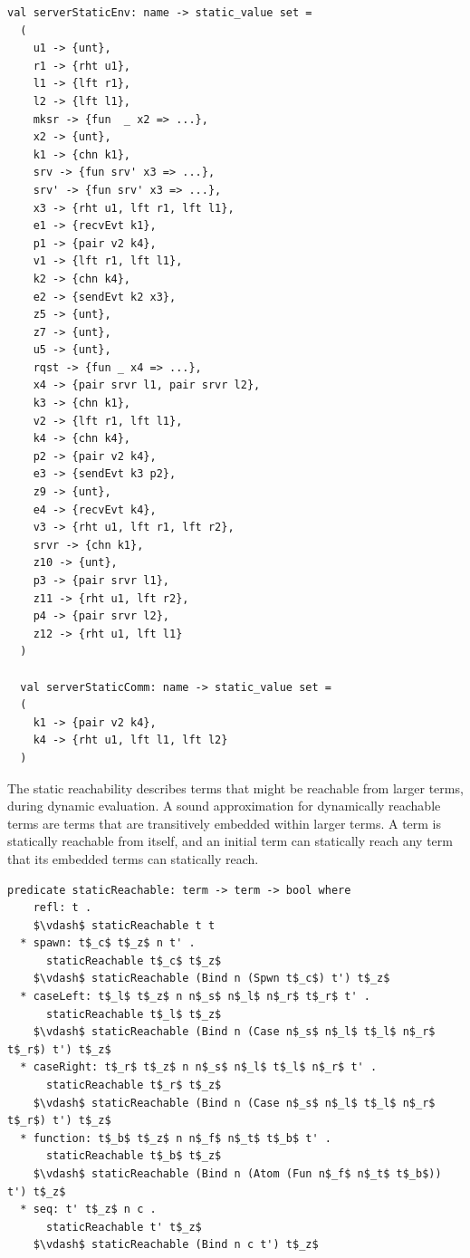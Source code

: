 \documentclass[letterpaper, 11pt]{extarticle}
\begin{document}
\begin{lstlisting}[language=sugar_lang, mathescape]
  val serverStaticEnv: name -> static_value set =
  (
    u1 -> {unt},
    r1 -> {rht u1},
    l1 -> {lft r1},
    l2 -> {lft l1},
    mksr -> {fun  _ x2 => ...},
    x2 -> {unt},
    k1 -> {chn k1},
    srv -> {fun srv' x3 => ...},
    srv' -> {fun srv' x3 => ...},
    x3 -> {rht u1, lft r1, lft l1},
    e1 -> {recvEvt k1},
    p1 -> {pair v2 k4},
    v1 -> {lft r1, lft l1},
    k2 -> {chn k4},
    e2 -> {sendEvt k2 x3},
    z5 -> {unt},
    z7 -> {unt},
    u5 -> {unt},
    rqst -> {fun _ x4 => ...},
    x4 -> {pair srvr l1, pair srvr l2},
    k3 -> {chn k1},
    v2 -> {lft r1, lft l1},
    k4 -> {chn k4},
    p2 -> {pair v2 k4},
    e3 -> {sendEvt k3 p2},
    z9 -> {unt},
    e4 -> {recvEvt k4},
    v3 -> {rht u1, lft r1, lft r2},
    srvr -> {chn k1},
    z10 -> {unt},
    p3 -> {pair srvr l1},
    z11 -> {rht u1, lft r2},
    p4 -> {pair srvr l2},
    z12 -> {rht u1, lft l1}
  )

  val serverStaticComm: name -> static_value set =
  (
    k1 -> {pair v2 k4},
    k4 -> {rht u1, lft l1, lft l2}
  )
\end{lstlisting}

The static reachability describes terms that might be reachable from larger
terms, during dynamic evaluation.
A sound approximation for dynamically reachable terms are
terms that are transitively embedded within larger terms.
A term is statically reachable from itself,
and an initial term can statically reach any term that its embedded terms can statically reach.

\begin{lstlisting}[language=logic, mathescape]
  predicate staticReachable: term -> term -> bool where
    refl: t .
    $\vdash$ staticReachable t t 
  * spawn: t$_c$ t$_z$ n t' . 
      staticReachable t$_c$ t$_z$
    $\vdash$ staticReachable (Bind n (Spwn t$_c$) t') t$_z$
  * caseLeft: t$_l$ t$_z$ n n$_s$ n$_l$ n$_r$ t$_r$ t' . 
      staticReachable t$_l$ t$_z$
    $\vdash$ staticReachable (Bind n (Case n$_s$ n$_l$ t$_l$ n$_r$ t$_r$) t') t$_z$
  * caseRight: t$_r$ t$_z$ n n$_s$ n$_l$ t$_l$ n$_r$ t' . 
      staticReachable t$_r$ t$_z$
    $\vdash$ staticReachable (Bind n (Case n$_s$ n$_l$ t$_l$ n$_r$ t$_r$) t') t$_z$
  * function: t$_b$ t$_z$ n n$_f$ n$_t$ t$_b$ t' . 
      staticReachable t$_b$ t$_z$
    $\vdash$ staticReachable (Bind n (Atom (Fun n$_f$ n$_t$ t$_b$)) t') t$_z$
  * seq: t' t$_z$ n c . 
      staticReachable t' t$_z$
    $\vdash$ staticReachable (Bind n c t') t$_z$
\end{lstlisting}
\end{document}
